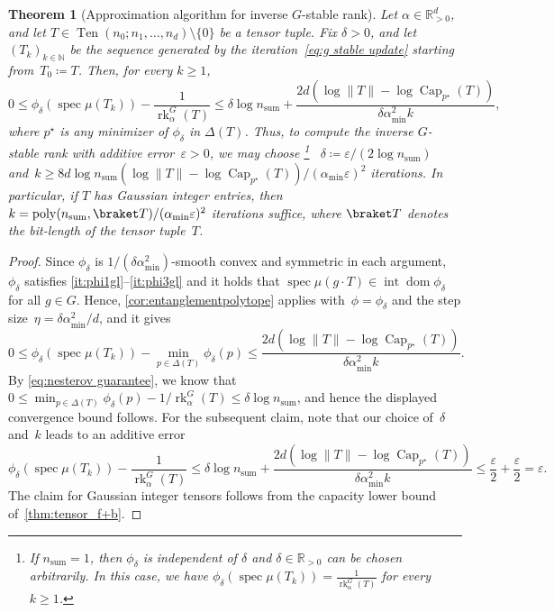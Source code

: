 \documentclass[11pt,letterpaper]{article}
\newtheorem{theorem}{Theorem}[section]
\numberwithin{equation}{section}
\newcommand{\eps}{\varepsilon}
\newcommand{\RR}{\mathbb{R}}
\newcommand{\NN}{\mathbb{N}}
\DeclareMathOperator{\poly}{poly}
\DeclareMathOperator{\intr}{int}
\DeclareMathOperator{\dom}{dom}
\DeclareMathOperator{\spec}{spec}
\DeclareMathOperator{\Capacity}{Cap}
\DeclareMathOperator{\rk}{rk}
\DeclareMathOperator{\Ten}{Ten}
\DeclareMathOperator{\Sum}{sum}
\begin{document}
\begin{theorem}[Approximation algorithm for inverse $G$-stable rank]\label{thm:Gstable}
Let $\alpha\in\RR^d_{>0}$, and let $T \in \Ten(n_0; n_1, \ldots, n_d)\setminus\{0\}$ be a tensor tuple.
Fix $\delta>0$, and let~$(T_k)_{k\in\NN}$ be the sequence generated by the iteration~\eqref{eq:g stable update} starting from~$T_0 \coloneqq T$.
Then, for every $k\geq1$,
\[
    0 \leq \phi_\delta(\spec\mu(T_k)) - \frac1{\rk_\alpha^G(T)} \leq \delta\log n_{\Sum} + \frac{2d\left(\log\|T\| - \log\Capacity_{p^\star}(T)\right)}{\delta\alpha_{\min}^2k},
\]
where $p^\star$ is any minimizer of $\phi_\delta$ in $\Delta(T)$.
Thus, to compute the inverse $G$-stable rank with additive error~$\eps>0$, we may choose%
\footnote{If $n_{\Sum}=1$, then $\phi_\delta$ is independent of $\delta$ and $\delta\in\RR_{>0}$ can be chosen arbitrarily. In this case, we have $\phi_{\delta}(\spec\mu(T_k))=\frac{1}{\rk_\alpha^G(T)}$ for every $k\geq 1$.}%
~$\delta\coloneqq\eps/(2\log n_{\Sum})$ and~$k\geq 8d\log n_{\Sum}(\log\|T\| - \log\Capacity_{p^\star}(T))/(\alpha_{\min}\varepsilon)^2$ iterations.
In particular, if $T$ has Gaussian integer entries, then $k = \poly(n_{\Sum}, \braket T)/(\alpha_{\min}\varepsilon)^2$ iterations suffice, where $\braket T$ denotes the bit-length of the tensor tuple~$T$.
\end{theorem}
\begin{proof}
    Since $\phi_\delta$ is $1/(\delta\alpha_{\min}^2)$-smooth convex and symmetric in each argument, $\phi_\delta$ satisfies \ref{it:phi1gl}--\ref{it:phi3gl} and it holds that $\spec \mu(g\cdot T) \in \intr\dom\phi_\delta$ for all $g \in G$.
    Hence, \cref{cor:entanglementpolytope} applies with~$\phi = \phi_\delta$ and the step size~$\eta = \delta\alpha_{\min}^2/d$, and it gives
    \[
        0 \leq \phi_\delta(\spec\mu(T_k)) - \min_{p \in \Delta(T)}\phi_\delta(p) \le \frac{2d\left(\log\|T\| - \log\Capacity_{p^\star}(T)\right)}{\delta\alpha_{\min}^2k}.
    \]
    By \cref{eq:nesterov guarantee}, we know that $0 \le \min_{p \in \Delta(T)}\phi_\delta(p) - 1/\rk_\alpha^G(T) \le \delta\log n_{\Sum}$, and hence the displayed convergence bound follows.
    For the subsequent claim, note that our choice of~$\delta$ and~$k$ leads to an additive error
    \[
        \phi_\delta(\spec\mu(T_k)) - \frac1{\rk_\alpha^G(T)} \le \delta\log n_{\Sum} + \frac{2d\left(\log\|T\| - \log\Capacity_{p^\star}(T)\right)}{\delta\alpha_{\min}^2k} \leq \frac\varepsilon2 + \frac\varepsilon2 = \varepsilon.
    \]
    The claim for Gaussian integer tensors follows from the capacity lower bound of~\cref{thm:tensor_f+b}.
\end{proof}
\end{document}
